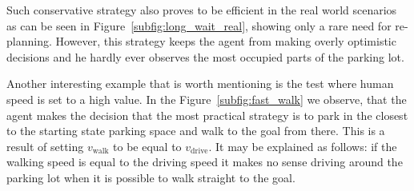 Such conservative strategy also proves to be efficient in the real world
scenarios as can be seen in Figure~\ref{subfig:long_wait_real}, showing only a
rare need for re-planning. However, this strategy keeps the agent from making
overly optimistic decisions and he hardly ever observes the most occupied
parts of the parking lot.

Another interesting example that is worth mentioning is the test where human
speed is set to a high value. In the Figure~\ref{subfig:fast_walk} we observe,
that the agent makes the decision that the most practical strategy is to park
in the closest to the starting state parking space and walk to the goal from
there. This is a result of setting $v_{\mathrm{walk}}$ to be equal to $v_{\mathrm{drive}}$. It
may be explained as follows: if the walking speed is equal to the driving
speed it makes no sense driving around the parking lot when it is possible to
walk straight to the goal.


